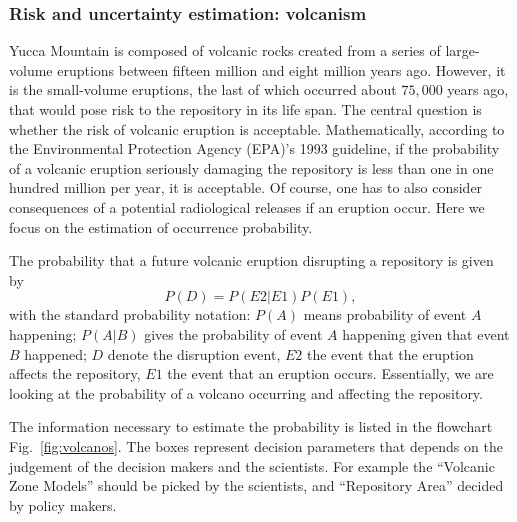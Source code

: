 \documentclass[nofootinbib,preprint,aps]{revtex4-1}
\begin{document}
        \subsubsection{Risk and uncertainty estimation: volcanism}
        \label{sec:volcano}
        Yucca Mountain is composed of volcanic rocks created from a series of large-volume eruptions between
        fifteen million and eight million years ago. However, it is the small-volume eruptions, the last of
        which occurred about $75,000$ years ago, that would pose risk to the repository in its life span.
        The central question is whether the risk of volcanic eruption is acceptable. Mathematically,
        according to the Environmental Protection Agency (EPA)'s 1993 guideline,
        if the probability of a volcanic eruption seriously damaging the repository is less than
        one in one hundred million per year, it is acceptable.\cite{epa93}
        Of course, one has to also consider consequences of a potential radiological releases if an eruption
        occur. Here we focus on the estimation of occurrence probability.

        The probability that a future volcanic eruption disrupting a repository is given by
        \begin{equation}
            \label{eq:prob}
            P(D) = P(E2|E1)P(E1),
        \end{equation}
        with the standard probability notation: 
        $P(A)$ means probability of event $A$ happening;
        $P(A|B)$ gives the probability of event $A$ happening given that event $B$ happened;
        $D$ denote the disruption event,
        $E2$ the event that the eruption affects the repository, $E1$ the event that an eruption occurs.
        Essentially, we are looking at the probability of a volcano occurring and affecting the repository.

        The information necessary to estimate the probability is listed in the flowchart Fig.~\ref{fig:volcanos}.
        The boxes represent decision parameters that depends on the judgement of the decision makers and
        the scientists. For example the ``Volcanic Zone Models'' should be picked by the scientists, and
        ``Repository Area'' decided by policy makers.
        
\end{document}
